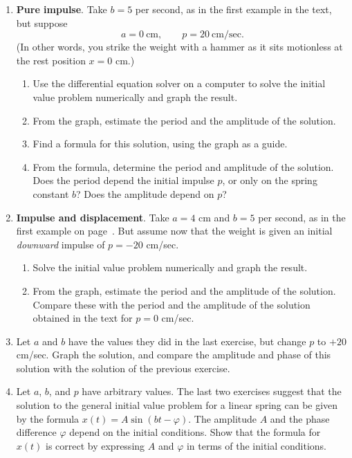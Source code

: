 \begin{enumerate}
\item {\bf Pure impulse}. Take $b = 5$ per second, as in
the first example in the text, but suppose
	\[
a = 0 \ \mbox{cm}, \qquad p = 20 \ \mbox{cm/sec}.
\] 
(In other words, you strike the weight with a hammer as it sits
        motionless at the rest position $x = 0$ cm.)


  \begin{enumerate}
  \item Use the differential equation solver on a computer to solve the
initial value problem numerically and graph the result.

  \item From the graph, estimate the period and the amplitude of the
solution.

  \item Find a formula for this solution, using the graph as a guide.

  \item From the formula, determine the period and amplitude of the
solution.  Does the period depend the initial impulse $p$, or only on
the spring constant $b$?  Does the amplitude depend on $p$?


\end{enumerate}
\item {\bf Impulse and displacement}.  Take $a = 4$ cm and $b = 5$ per
second, as in the first example on page~\pageref{examples}.  But
assume now that the weight is given an initial {\em downward\/}
impulse of $p = -20$ cm/sec.

  \begin{enumerate}
  \item Solve the initial value problem numerically and graph the result.

  \item From the graph, estimate the period and the amplitude of the
solution.  Compare these with the period and the amplitude of the
solution obtained in the text for $p = 0$ cm/sec.


\end{enumerate}
\item Let $a$ and $b$ have the values they did in the last exercise,
but change $p$ to $+20$ cm/sec.  Graph the solution, and compare the
amplitude and phase of this solution with the solution of the previous
exercise.


\item Let $a$, $b$, and $p$ have arbitrary values.  The last two
exercises suggest that the solution to the general initial value
problem for a linear spring can be given by the formula $x(t) =
A\sin(bt - \varphi)$.  The amplitude $A$ and the phase difference
$\varphi$ depend on the initial conditions.  Show that the formula for
$x(t)$ is correct by expressing $A$ and $\varphi$ in terms of the
initial conditions.



\end{enumerate}
